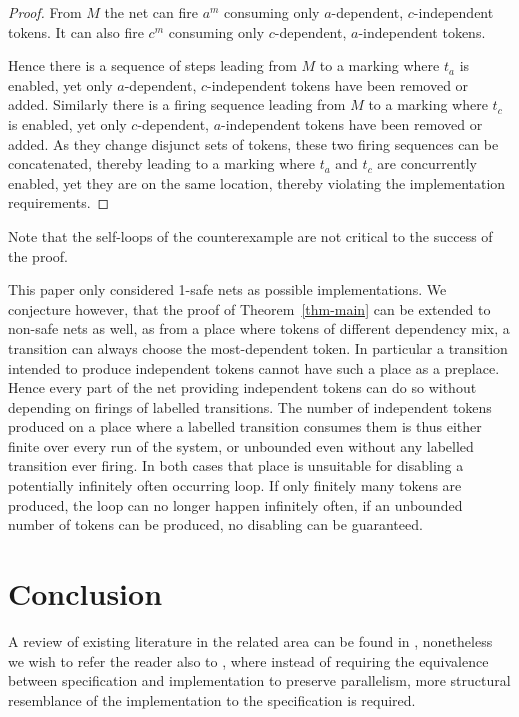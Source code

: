 \documentclass[submission,copyright,creativecommons]{eptcs}
\theoremstyle{definition}
\def\theoremname{Theorem}
\newcommand{\refthm}[1]{\theoremname~\ref{thm-#1}}
\begin{document}
\begin{proof}
  From $M$ the net can fire $a^m$ consuming only $a$-dependent,
  $c$-independent tokens. It can also fire $c^m$ consuming only $c$-dependent, $a$-independent tokens. 

  Hence there is a sequence of steps leading from $M$ to a marking where $t_a$ is enabled, yet
  only $a$-dependent, $c$-independent tokens have been removed or added.
  Similarly there is a firing sequence leading from $M$ to a marking where $t_c$ is enabled, yet
  only $c$-dependent, $a$-independent tokens have been removed or added.
  As they change disjunct sets of tokens, these two firing sequences can be concatenated, thereby
  leading to a marking where $t_a$ and $t_c$ are concurrently enabled, yet they are on the same location,
  thereby violating the implementation requirements.
\end{proof}

\noindent
Note that the self-loops of the counterexample are not critical to the success of the proof.

This paper only considered 1-safe nets as possible implementations. We conjecture however, that the
proof of \refthm{main} can be extended to non-safe nets as well, as from a place where tokens of different
dependency mix, a transition can always choose the most-dependent token.
In particular a transition intended to produce independent tokens cannot have such a place as a preplace.
Hence every part of the net providing
independent tokens can do so without depending on firings of labelled transitions.
The number of independent tokens produced on a place where a labelled transition consumes
them is thus either finite over every run of the system, or unbounded even without any labelled
transition ever firing. In both cases that place is unsuitable for disabling a potentially
infinitely often occurring loop. If only finitely many tokens are produced, the loop can no longer
happen infinitely often, if an unbounded number of tokens can be produced, no disabling can
be guaranteed.

\section{Conclusion}\label{sec-conclusion}

A review of existing literature in the related area can be found in
\cite{glabbeek08syncasyncinteraction}, nonetheless we wish to refer the reader also to
\cite{hopkins91distnets}, where instead of requiring the equivalence between
specification and implementation to
preserve parallelism, more structural resemblance of the implementation to the
specification is required.
\end{document}
